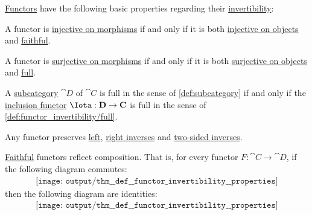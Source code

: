 \begin{proposition}\label{thm:def:functor_invertibility}
  \hyperref[def:functor]{Functors} have the following basic properties regarding their \hyperref[def:functor_invertibility]{invertibility}:

  \begin{thmenum}
     A functor is \hyperref[def:functor_invertibility/injective_on_morphisms]{injective on morphisms} if and only if it is both \hyperref[def:functor_invertibility/injective_on_objects]{injective on objects} and \hyperref[def:functor_invertibility/faithful]{faithful}.

     A functor is \hyperref[def:functor_invertibility/surjective_on_morphisms]{surjective on morphisms} if and only if it is both \hyperref[def:functor_invertibility/surjective_on_objects]{surjective on objects} and \hyperref[def:functor_invertibility/full]{full}.

     A \hyperref[def:subcategory]{subcategory} \( \cat{D} \) of \( \cat{C} \) is full in the sense of \cref{def:subcategory} if and only if the \hyperref[def:subcategory]{inclusion functor} \( \Iota: \cat{D} \to \cat{C} \) is full in the sense of \cref{def:functor_invertibility/full}.

     Any functor preserves \hyperref[def:morphism_invertibility/left_invertible]{left}, \hyperref[def:morphism_invertibility/right_invertible]{right inverses} and \hyperref[def:morphism_invertibility/isomorphism]{two-sided inverses}.

     \hyperref[def:functor_invertibility/faithful]{Faithful} functors reflect composition. That is, for every functor \( F: \cat{C} \to \cat{D} \), if the following diagram commutes:
    \begin{equation}\label{eq:thm:def:functor_invertibility/faithful_reflects_composition/image}
      \begin{aligned}
        \texttt{[image: output/thm\_\_def\_\_functor\_invertibility\_\_properties]}
      \end{aligned}
    \end{equation}
    then the following diagram are identities:
    \begin{equation}\label{eq:thm:def:functor_invertibility/faithful_reflects_composition/source}
      \begin{aligned}
        \texttt{[image: output/thm\_\_def\_\_functor\_invertibility\_\_properties]}
      \end{aligned}
    \end{equation}


\end{thmenum}
\end{proposition}

